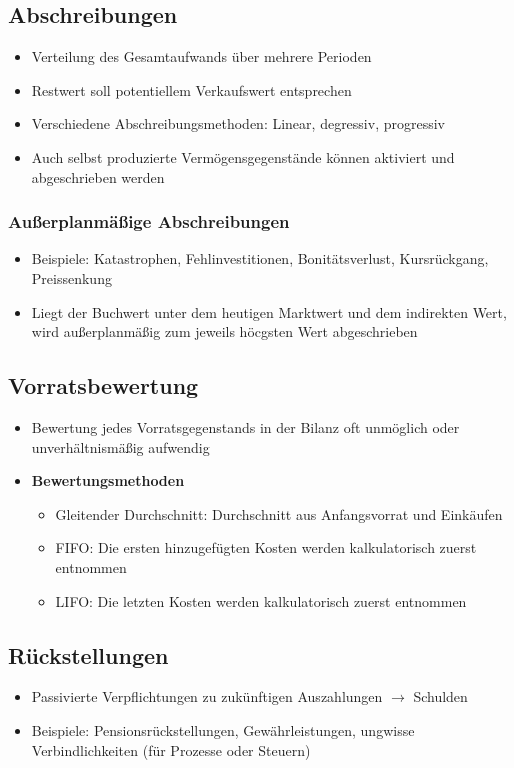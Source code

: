 \subsection{Abschreibungen}
\begin{itemize}
	\item Verteilung des Gesamtaufwands über mehrere Perioden
	\item Restwert soll potentiellem Verkaufswert entsprechen
	\item Verschiedene Abschreibungsmethoden: Linear, degressiv, progressiv
	\item Auch selbst produzierte Vermögensgegenstände können aktiviert und abgeschrieben werden
\end{itemize}

\subsubsection{Außerplanmäßige Abschreibungen}
\begin{itemize}
	\item Beispiele: Katastrophen, Fehlinvestitionen, Bonitätsverlust, Kursrückgang, Preissenkung
	\item Liegt der Buchwert unter dem heutigen Marktwert und dem indirekten Wert, wird außerplanmäßig zum jeweils höcgsten Wert abgeschrieben
\end{itemize}


\subsection{Vorratsbewertung}
\begin{itemize}
	\item Bewertung jedes Vorratsgegenstands in der Bilanz oft unmöglich oder unverhältnismäßig aufwendig
	\item \textbf{Bewertungsmethoden}
	\begin{itemize}
		\item Gleitender Durchschnitt: Durchschnitt aus Anfangsvorrat und Einkäufen
		\item FIFO: Die ersten hinzugefügten Kosten werden kalkulatorisch zuerst entnommen
		\item LIFO: Die letzten Kosten werden kalkulatorisch zuerst entnommen
	\end{itemize}
\end{itemize}


\subsection{Rückstellungen}
\begin{itemize}
	\item Passivierte Verpflichtungen zu zukünftigen Auszahlungen \(\rightarrow\) Schulden
	\item Beispiele: Pensionsrückstellungen, Gewährleistungen, ungwisse Verbindlichkeiten (für Prozesse oder Steuern)
\end{itemize}


